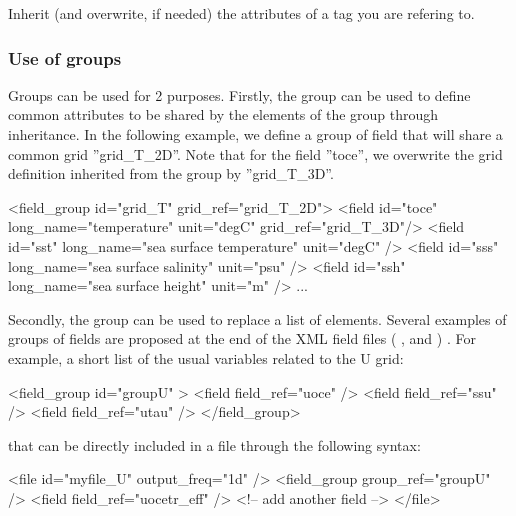 \documentclass[../main/NEMO_manual]{subfiles}
\begin{document}
Inherit (and overwrite, if needed) the attributes of a tag you are refering to.

\subsubsection{Use of groups}

Groups can be used for 2 purposes.
Firstly, the group can be used to define common attributes to be shared by the elements of
the group through inheritance.
In the following example, we define a group of field that will share a common grid ''grid\_T\_2D''.
Note that for the field ''toce'', we overwrite the grid definition inherited from the group by ''grid\_T\_3D''.

\begin{xmllines}
<field_group id="grid_T" grid_ref="grid_T_2D">
	<field id="toce" long_name="temperature"             unit="degC" grid_ref="grid_T_3D"/>
	<field id="sst"  long_name="sea surface temperature" unit="degC"                     />
	<field id="sss"  long_name="sea surface salinity"    unit="psu"                      />
	<field id="ssh"  long_name="sea surface height"      unit="m"                        />
	...
\end{xmllines}

Secondly, the group can be used to replace a list of elements.
Several examples of groups of fields are proposed at the end of the XML field files (
,
 and
 ) .
For example, a short list of the usual variables related to the U grid:

\begin{xmllines}
<field_group id="groupU" >
	<field field_ref="uoce"  />
	<field field_ref="ssu" />
	<field field_ref="utau"  />
</field_group>
\end{xmllines}

that can be directly included in a file through the following syntax:

\begin{xmllines}
<file id="myfile_U" output_freq="1d" />
	<field_group group_ref="groupU" />
	<field field_ref="uocetr_eff"   />  <!-- add another field -->
</file>
\end{xmllines}

\end{document}
